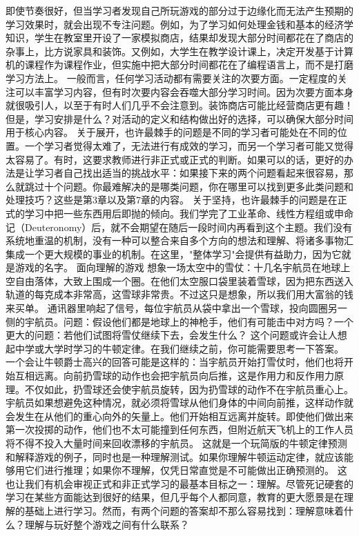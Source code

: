 即使节奏很好，但当学习者发现自己所玩游戏的部分过于边缘化而无法产生预期的学习效果时，就会出现不专注问题。例如，为了学习如何处理金钱和基本的经济学知识，学生在教室里开设了一家模拟商店，结果却发现大部分时间都花在了商店的杂事上，比方说家具和装饰。又例如，大学生在教学设计课上，决定开发基于计算机的课程作为课程作业，但实施中把大部分时间都花在了编程语言上，而不是打磨学习方法上。
一般而言，任何学习活动都有需要关注的次要方面。一定程度的关注可以丰富学习内容，但有时次要内容会吞噬大部分学习时间。因为次要方面本身就很吸引人，以至于有时人们几乎不会注意到。装饰商店可能比经营商店更有趣！但是，学习安排是什么？对活动的定义和结构做出好的选择，可以确保大部分时间用于核心内容。
关于展开，也许最棘手的问题是不同的学习者可能处在不同的位置。一个学习者觉得太难了，无法进行有成效的学习，而另一个学习者可能又觉得太容易了。有时，这要求教师进行非正式或正式的判断。如果可以的话，更好的办法是让学习者自己找出适当的挑战水平：如果接下来的两个问题看起来很容易，那么就跳过十个问题。你最难解决的是哪类问题，你在哪里可以找到更多此类问题和处理技巧？这些是第3章以及第7章的内容。
关于坚持，也许最棘手的问题是在正式的学习中把一些东西用后即抛的倾向。我们学完了工业革命、线性方程组或申命记（Deuteronomy）后，就不会期望在随后一段时间内再看到这个主题。我们没有系统地重温的机制，没有一种可以整合来自多个方向的想法和理解、将诸多事物汇集成一个更大规模的事业的机制。在这里，"整体学习"会提供有益助力，因为它就是游戏的名字。
面向理解的游戏
想象一场太空中的雪仗：十几名宇航员在地球上空自由落体，大致上围成一个圈。在他们太空服口袋里装着雪球，因为把东西送入轨道的每克成本非常高，这雪球非常贵。不过这只是想象，所以我们用大富翁的钱来买单。
通讯器里响起了信号，每位宇航员从袋中拿出一个雪球，投向圆圈另一侧的宇航员。问题：假设他们都是地球上的神枪手，他们有可能击中对方吗？一个更大的问题：若他们试图将雪仗继续下去，会发生什么？
这个问题或许会让人想起中学或大学时学习的牛顿定律。在我们继续之前，你可能需要思考一下答案。
一个会让牛顿爵士高兴的回答可能是这样的：当宇航员开始打雪仗时，他们也将开始互相远离。向前扔雪球的动作也会把宇航员向后推，这是作用力和反作用力原理。不仅如此，扔雪球还会使宇航员旋转，因为扔雪球的动作不在宇航员重心上。宇航员如果想避免这种情况，就必须将雪球从他们身体的中间向前推，这样动作就会发生在从他们的重心向外的矢量上。他们开始相互远离并旋转。即使他们做出来第一次投掷的动作，他们也不太可能撞到任何东西，但附近航天飞机上的工作人员将不得不投入大量时间来回收漂移的宇航员。
这就是一个玩简版的牛顿定律预测和解释游戏的例子，同时也是一种理解测试。如果你理解牛顿运动定律，就应该能够用它们进行推理；如果你不理解，仅凭日常直觉是不可能做出正确预测的。
这也让我们有机会审视正式和非正式学习的最基本目标之一：理解。尽管死记硬套的学习在某些方面能达到很好的结果，但几乎每个人都同意，教育的更大愿景是在理解的基础上进行学习。然而，有两个问题的答案却不那么容易找到：理解意味着什么？理解与玩好整个游戏之间有什么联系？
